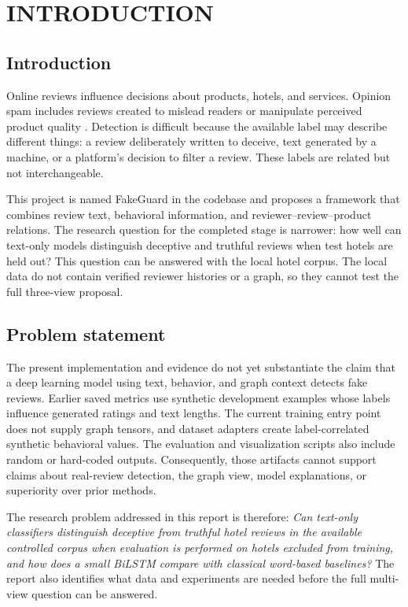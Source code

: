 \documentclass[12pt,a4paper]{report}
\begin{document}
\clearpage
\tableofcontents
\clearpage
{}

\chapter{INTRODUCTION}

\section{Introduction}

Online reviews influence decisions about products, hotels, and services. Opinion spam includes reviews created to mislead readers or manipulate perceived product quality \cite{jindal2008}. Detection is difficult because the available label may describe different things: a review deliberately written to deceive, text generated by a machine, or a platform's decision to filter a review. These labels are related but not interchangeable.

This project is named FakeGuard in the codebase and proposes a framework that combines review text, behavioral information, and reviewer--review--product relations. The research question for the completed stage is narrower: how well can text-only models distinguish deceptive and truthful reviews when test hotels are held out? This question can be answered with the local hotel corpus. The local data do not contain verified reviewer histories or a graph, so they cannot test the full three-view proposal.

\section{Problem statement}

The present implementation and evidence do not yet substantiate the claim that a deep learning model using text, behavior, and graph context detects fake reviews. Earlier saved metrics use synthetic development examples whose labels influence generated ratings and text lengths. The current training entry point does not supply graph tensors, and dataset adapters create label-correlated synthetic behavioral values. The evaluation and visualization scripts also include random or hard-coded outputs. Consequently, those artifacts cannot support claims about real-review detection, the graph view, model explanations, or superiority over prior methods.

The research problem addressed in this report is therefore: \textit{Can text-only classifiers distinguish deceptive from truthful hotel reviews in the available controlled corpus when evaluation is performed on hotels excluded from training, and how does a small BiLSTM compare with classical word-based baselines?} The report also identifies what data and experiments are needed before the full multi-view question can be answered.
\end{document}
